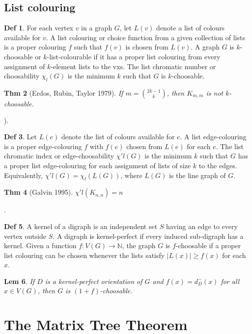 \documentclass[11pt, fleqn, a4paper, landscape]{article}
\theoremstyle{plain} %
\newtheorem{thm}{Thm}
\newtheorem{lem}[thm]{Lem}
\theoremstyle{remark} %
\theoremstyle{definition} %
\newtheorem{defi}[thm]{Def}
\begin{document}
\begin{multicols}{5}
\subsection{List colouring}

\begin{defi}
For each vertex $v$ in a graph $G$, let $L(v)$ denote a list of colours available for $v$. A list colouring or choice function from a given collection of lists is a proper colouring $f$ such that $f(v)$ is chosen from $L(v)$. A graph $G$ is $k$-choosable or $k$-list-colourable if it has a proper list colouring from every assignment of $k$-element lists to the vxs. The list chromatic number or choosability $\chi_l(G)$ is the minimum $k$ such that $G$ is $k$-choosable.
\end{defi}

\begin{thm}[Erdos, Rubin, Taylor 1979]
If $m = \binom{2k-1}{k}$, then $K_{m,m}$ is not $k$-choosable.
\end{thm}). 

\begin{defi}
Let $L(e)$ denote the list of colours available for $e$. A list edge-colouring is a proper edge-colouring $f$ with $f(e)$ chosen from $L(e)$ for each $e$. The list chromatic index or edge-choosability $\chi' l(G)$ is the minimum $k$ such that $G$ has a proper list edge-colouring for each assignment of lists of size $k$ to the edges. Equivalently, $\chi'
l(G) = \chi_l(L(G))$, where $L(G)$ is the line graph of $G$.
\end{defi}
\addtocounter{thm}{1}
\begin{thm}[Galvin 1995]
$\chi' l(K_{n,n}) = n$
\end{thm}.

\begin{defi}
A kernel of a digraph is an independent set $S$ having an edge to every vertex
outside $S$. A digraph is kernel-perfect if every induced sub-digraph has a kernel. Given a function $f : V (G) \to \mathbb{N}$, the graph $G$ is $f$-choosable if a proper list colouring can be chosen whenever the lists
satisfy $|L(x)|\ge f(x)$ for each $x$.
\end{defi}

\begin{lem}
If $D$ is a kernel-perfect orientation of $G$ and $f(x) = d^-_D(x)$ for all $x \in V (G)$, then $G$ is $(1 + f)$-choosable.
\end{lem}

\section{The Matrix Tree Theorem}


\end{multicols}
\end{document}
